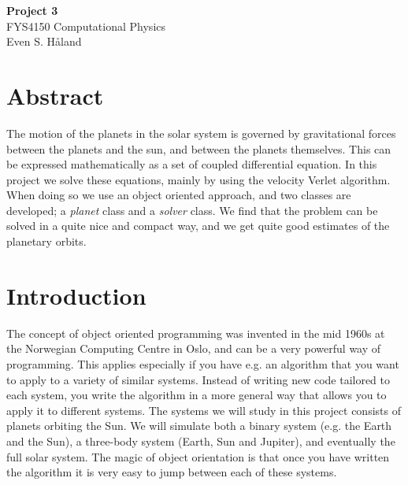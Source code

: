 \documentclass[12pt, a4paper]{article}
\begin{document}
\begin{titlepage}
\begin{center}
\vspace*{3cm}
\Huge
\textbf{Project 3} \\
\Large  
FYS4150 Computational Physics 
\vspace*{3cm} \\ 

Even S. Håland 
\vspace*{5cm} \\

\normalsize
\section*{Abstract}

The motion of the planets in the solar system is governed by gravitational forces between the planets 
and the sun, and between the planets themselves. This can be expressed mathematically as a set of coupled 
differential equation. In this project we solve these equations, mainly by using the velocity Verlet 
algorithm. When doing so we use an object oriented approach, and two classes are developed; a 
\textit{planet} class and a \textit{solver} class. We find that the problem can be solved in a quite nice 
and compact way, and we get quite good estimates of the planetary orbits.  

\end{center}
\end{titlepage}

\section{Introduction}

The concept of object oriented programming was invented in the mid 1960s at the Norwegian Computing 
Centre in Oslo\cite{OOP}, and can be a very powerful way of programming. This applies especially if 
you have e.g. an algorithm that you want to apply to a variety of similar systems. Instead of writing 
new code tailored to each system, you write the algorithm in a more general way that allows you to 
apply it to different systems. The systems we will study in this project consists of planets 
orbiting the Sun. We will simulate both a binary system (e.g. the Earth and the Sun), a three-body system 
(Earth, Sun and Jupiter), and eventually the full solar system. The magic of object orientation is that 
once you have written the algorithm it is very easy to jump between each of these systems. 
\end{document}
